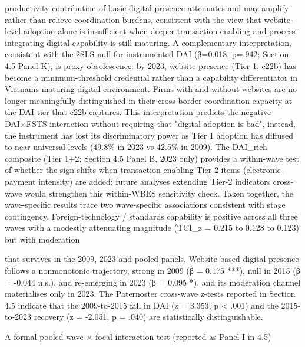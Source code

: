 \documentclass[12pt,a4paper]{article}
\begin{document}
productivity contribution of basic digital presence attenuates and may
amplify rather than relieve coordination burdens, consistent with the
view that website-level adoption alone is insufficient when deeper
transaction-enabling and process-integrating digital capability is still
maturing. A complementary interpretation, consistent with the 2SLS null
for instrumented DAI (β=0.018, p=.942; Section 4.5 Panel K), is proxy
obsolescence: by 2023, website presence (Tier 1, c22b) has become a
minimum-threshold credential rather than a capability differentiator in
Vietnam\textquotesingle s maturing digital environment. Firms with and
without websites are no longer meaningfully distinguished in their
cross-border coordination capacity at the DAI tier that c22b captures.
This interpretation predicts the negative DAI×FSTS interaction without
requiring that "digital adoption is bad", instead, the instrument has
lost its discriminatory power as Tier 1 adoption has diffused to
near-universal levels (49.8\% in 2023 vs 42.5\% in 2009). The DAI\_rich
composite (Tier 1+2; Section 4.5 Panel B, 2023 only) provides a
within-wave test of whether the sign shifts when transaction-enabling
Tier-2 items (electronic-payment intensity) are added; future analyses
extending Tier-2 indicators cross-wave would strengthen this within-WBES
sensitivity check. Taken together, the wave-specific results trace two
wave-specific associations consistent with stage contingency.
Foreign-technology / standards capability is positive across all three
waves with a modestly attenuating magnitude (TCI\_z = 0.215 to 0.128 to
0.123) but with moderation

that survives in the 2009, 2023 and pooled panels. Website-based digital
presence follows a nonmonotonic trajectory, strong in 2009 (β = 0.175
***), null in 2015 (β = -0.044 n.s.), and re-emerging in 2023 (β = 0.095
*), and its moderation channel materialises only in 2023. The
Paternoster cross-wave z-tests reported in Section 4.5 indicate that the
2009-to-2015 fall in DAI (z = 3.353, p \textless{} .001) and the
2015-to-2023 recovery (z = -2.051, p = .040) are statistically
distinguishable.

A formal pooled wave × focal interaction test (reported as Panel I in
4.5)
\end{document}
